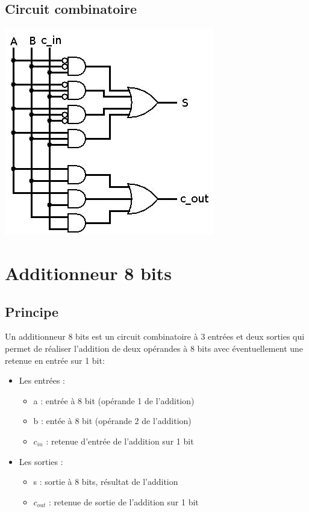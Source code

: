 \documentclass[10pt,a4paper]{article}
\begin{document}
\subsection{Circuit combinatoire}
\includegraphics[scale=0.5]{Add1bit.jpg} 

\section{Additionneur 8 bits}
\subsection{Principe}
Un additionneur 8 bits est un circuit combinatoire à 3 entrées et deux sorties qui permet de réaliser l'addition de deux opérandes à 8 bits avec éventuellement une retenue en entrée sur 1 bit:
\begin{itemize}
\item 	Les entrées :
		\begin{itemize}
		\item a : entrée à 8 bit (opérande 1 de l'addition)
		\item b : entée à 8	bit (opérande 2 de l'addition)
		\item $c_{in}$ : retenue d'entrée de l'addition sur 1 bit
		\end{itemize}
\item 	Les sorties :
		\begin{itemize}
		\item s : sortie à 8 bits, résultat de l'addition
		\item $c_{out}$ : retenue de sortie de l'addition sur 1 bit
		\end{itemize}
\end{itemize}
\end{document}
